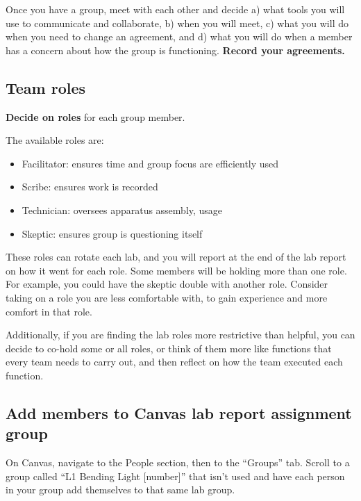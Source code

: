 \begin{steps}
	\item Once you have a group, meet with each other and decide a) what tools you will use to communicate and collaborate, b) when you will meet, c) what you will do when you need to change an agreement, and d) what you will do when a member has a concern about how the group is functioning. \textbf{Record your agreements.}%
\end{steps}

\subsection{Team roles}

\begin{steps}
	\item \textbf{Decide on roles} for each group member.
\end{steps}

The available roles are:
\begin{itemize}
	\item Facilitator: ensures time and group focus are efficiently used
	\item Scribe: ensures work is recorded
	\item Technician: oversees apparatus assembly, usage
	\item Skeptic: ensures group is questioning itself
\end{itemize}

These roles can rotate each lab, and you will report at the end of the lab report on how it went for each role. Some members will be holding more than one role. For example, you could have the skeptic double with another role. Consider taking on a role you are less comfortable with, to gain experience and more comfort in that role.

Additionally, if you are finding the lab roles more restrictive than helpful, you can decide to co-hold some or all roles, or think of them more like functions that every team needs to carry out, and then reflect on how the team executed each function.

\subsection{Add members to Canvas lab report assignment group}

\begin{steps}
	\item On Canvas, navigate to the People section, then to the ``Groups'' tab. Scroll to a group called ``L1 Bending Light [number]'' that isn't used and have each person in your group add themselves to that same lab group.
\end{steps}

